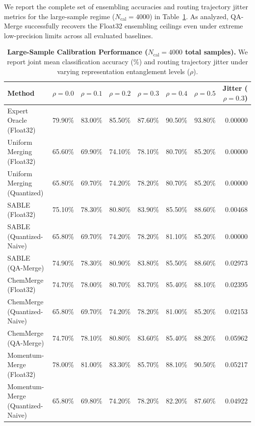 \documentclass{article}
\theoremstyle{plain}
\theoremstyle{definition}
\theoremstyle{remark}
\begin{document}
We report the complete set of ensembling accuracies and routing trajectory jitter metrics for the large-sample regime ($N_{\text{cal}} = 4000$) in Table~\ref{tab:large_sample}. As analyzed, QA-Merge successfully recovers the Float32 ensembling ceilings even under extreme low-precision limits across all evaluated baselines.

\begin{table}[t]
\caption{\textbf{Large-Sample Calibration Performance ($N_{\text{cal}} = 4000$ total samples).} We report joint mean classification accuracy (\%) and routing trajectory jitter under varying representation entanglement levels ($\rho$).}
\label{tab:large_sample}
\vskip 0.1in
\begin{center}
\begin{small}
\begin{sc}
\begin{tabular}{lccccccr}
\toprule
Method & $\rho = 0.0$ & $\rho = 0.1$ & $\rho = 0.2$ & $\rho = 0.3$ & $\rho = 0.4$ & $\rho = 0.5$ & Jitter ($\rho=0.3$) \\
\midrule
Expert Oracle (Float32) & 79.90\% & 83.00\% & 85.50\% & 87.60\% & 90.50\% & 93.80\% & 0.00000 \\
\midrule
Uniform Merging (Float32) & 65.60\% & 69.90\% & 74.10\% & 78.10\% & 80.70\% & 85.20\% & 0.00000 \\
Uniform Merging (Quantized) & 65.80\% & 69.70\% & 74.20\% & 78.20\% & 80.70\% & 85.20\% & 0.00000 \\
\midrule
SABLE (Float32) & 75.10\% & 78.30\% & 80.80\% & 83.90\% & 85.50\% & 88.60\% & 0.00468 \\
SABLE (Quantized-Naive) & 65.80\% & 69.70\% & 74.20\% & 78.20\% & 81.10\% & 85.20\% & 0.00000 \\
SABLE (QA-Merge) & 74.90\% & 78.30\% & 80.90\% & 83.80\% & 85.50\% & 88.60\% & 0.02973 \\
\midrule
ChemMerge (Float32) & 74.70\% & 78.00\% & 80.70\% & 83.70\% & 85.40\% & 88.10\% & 0.02395 \\
ChemMerge (Quantized-Naive) & 65.80\% & 69.70\% & 74.20\% & 78.20\% & 81.00\% & 85.20\% & 0.02153 \\
ChemMerge (QA-Merge) & 74.70\% & 78.10\% & 80.80\% & 83.60\% & 85.40\% & 88.20\% & 0.05962 \\
\midrule
Momentum-Merge (Float32) & 78.00\% & 81.00\% & 83.30\% & 85.70\% & 88.10\% & 90.50\% & 0.05217 \\
Momentum-Merge (Quantized-Naive) & 65.80\% & 69.80\% & 74.20\% & 78.20\% & 82.20\% & 87.60\% & 0.04922 \\

\end{tabular}
\end{sc}
\end{small}
\end{center}
\end{table}
\end{document}
